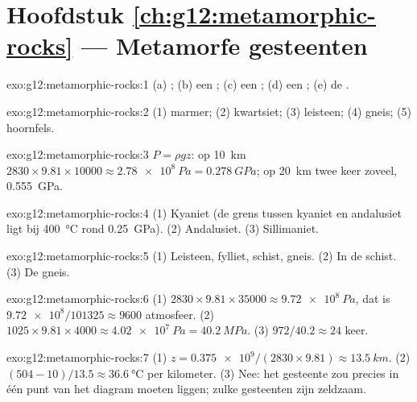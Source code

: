 \section*{Hoofdstuk \ref{ch:g12:metamorphic-rocks} --- Metamorfe gesteenten}

\begin{solution}{exo:g12:metamorphic-rocks:1}
(a) ; (b) een ; (c) een ; (d) een ;
(e) de .
\end{solution}

\begin{solution}{exo:g12:metamorphic-rocks:2}
(1) marmer; (2) kwartsiet; (3) leisteen; (4) gneis; (5) hoornfels.
\end{solution}

\begin{solution}{exo:g12:metamorphic-rocks:3}
$P = \rho g z$: op \qty{10}{km} $2830 \times 9.81 \times \num{10000} \approx
\qty{2.78e8}{Pa} = \qty{0.278}{GPa}$; op \qty{20}{km} twee keer zoveel,
\qty{0.555}{GPa}.
\end{solution}

\begin{solution}{exo:g12:metamorphic-rocks:4}
(1) Kyaniet (de grens tussen kyaniet en andalusiet ligt bij \qty{400}{\celsius} rond \qty{0.25}{GPa}).
(2) Andalusiet. (3) Sillimaniet.
\end{solution}

\begin{solution}{exo:g12:metamorphic-rocks:5}
(1) Leisteen, fylliet, schist, gneis. (2) In de schist. (3) De gneis.
\end{solution}

\begin{solution}{exo:g12:metamorphic-rocks:6}
(1) $2830 \times 9.81 \times \num{35000} \approx \qty{9.72e8}{Pa}$, dat is
$\num{9.72e8}/101325 \approx \num{9600}$ atmosfeer. (2) $1025 \times 9.81
\times 4000 \approx \qty{4.02e7}{Pa} = \qty{40.2}{MPa}$. (3) $972/40.2
\approx 24$ keer.
\end{solution}

\begin{solution}{exo:g12:metamorphic-rocks:7}
(1) $z = \num{0.375e9}/(2830 \times 9.81) \approx \qty{13.5}{km}$.
(2) $(504 - 10)/13.5 \approx \qty{36.6}{\celsius}$ per kilometer. (3) Nee:
het gesteente zou precies in één punt van het diagram moeten liggen; zulke gesteenten
zijn zeldzaam.
\end{solution}

